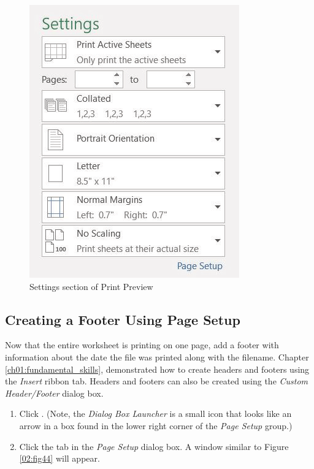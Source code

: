 \begin{figure}[H]
	\centering
	\includegraphics[width=\maxwidth{.95\linewidth}]{gfx/ch02_fig43}
	\caption{Settings section of Print Preview}
	\label{02:fig43}
\end{figure}

\subsection{Creating a Footer Using Page Setup}

Now that the entire worksheet is printing on one page, add a footer with information about the date the file was printed along with the filename. Chapter \ref{ch01:fundamental_skills},  demonstrated how to create headers and footers using the \textit{Insert} ribbon tab. Headers and footers can also be created using the \textit{Custom Header/Footer} dialog box.

\begin{enumerate}
	\item Click . (Note, the \textit{Dialog Box Launcher} is a small icon that looks like an arrow in a box found in the lower right corner of the \textit{Page Setup} group.)
	\item Click the  tab in the \textit{Page Setup} dialog box. A window similar to Figure \ref{02:fig44} will appear.
\end{enumerate}


